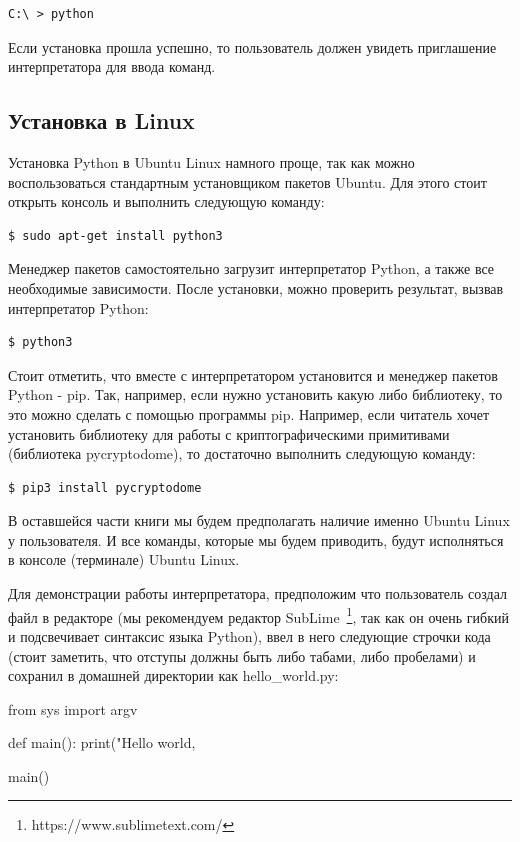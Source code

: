 \begin{verbatim}
C:\ > python
\end{verbatim}

Если установка прошла успешно, то пользователь должен увидеть приглашение 
интерпретатора для ввода команд.

\subsection{Установка в Linux}

Установка Python в Ubuntu Linux намного проще, так как можно воспользоваться
стандартным установщиком пакетов Ubuntu. Для этого стоит открыть консоль
и выполнить следующую команду:

\begin{verbatim}
$ sudo apt-get install python3
\end{verbatim}

Менеджер пакетов самостоятельно загрузит интерпретатор Python, а также
все необходимые зависимости. После установки, можно проверить результат,
вызвав интерпретатор Python:

\begin{verbatim}
$ python3
\end{verbatim}

Стоит отметить, что вместе с интерпретатором установится и менеджер пакетов Python
- pip. Так, например, если нужно установить какую либо библиотеку, то это можно 
сделать с помощью программы pip. Например, если читатель хочет установить библиотеку
для работы с криптографическими примитивами (библиотека pycryptodome), то достаточно 
выполнить следующую команду:

\begin{verbatim}
$ pip3 install pycryptodome
\end{verbatim} 

В оставшейся части книги мы будем предполагать наличие именно Ubuntu Linux у 
пользователя. И все команды, которые мы будем приводить, будут исполняться в 
консоле (терминале) Ubuntu Linux.

Для демонстрации работы интерпретатора, предположим что пользователь создал
файл в редакторе (мы рекомендуем редактор SubLime~\footnote{https://www.sublimetext.com/}, 
так как он очень гибкий и подсвечивает синтаксис языка Python), ввел в него следующие строчки
кода (стоит заметить, что отступы должны быть либо табами, либо пробелами) и сохранил в 
домашней директории как hello\_world.py:

\begin{python}
from sys import argv

def main():
	print("Hello world, %

main()
\end{python}

